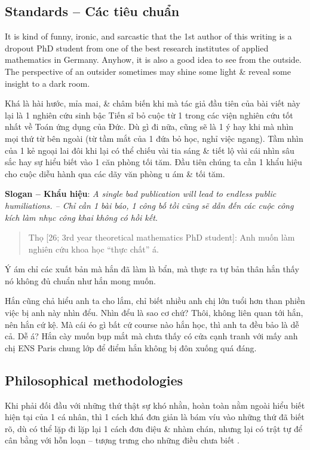 \documentclass[12pt]{article}
\begin{document}
\subsection{Standards -- Các tiêu chuẩn}
It is kind of funny, ironic, and sarcastic that the 1st author of this writing is a dropout PhD student from one of the best research institutes of applied mathematics in Germany. Anyhow, it is also a good idea to see from the outside. The perspective of an outsider sometimes may shine some light \& reveal some insight to a dark room.

Khá là hài hước, mỉa mai, \& châm biến khi mà tác giả đầu tiên của bài viết này lại là 1 nghiên cứu sinh bậc Tiến sĩ bỏ cuộc từ 1 trong các viện nghiên cứu tốt nhất về Toán ứng dụng của Đức. Dù gì đi nữa, cũng sẽ là 1 ý hay khi mà nhìn mọi thứ từ bên ngoài (từ tầm mắt của 1 đứa bỏ học, nghỉ việc ngang). Tầm nhìn của 1 kẻ ngoại lai đôi khi lại có thể chiếu vài tia sáng \& tiết lộ vài cái nhìn sâu sắc hay sự hiểu biết vào 1 căn phòng tối tăm. Đầu tiên chúng ta cần 1 khẩu hiệu cho cuộc diễu hành qua các dãy văn phòng u ám \& tối tăm.

\vspace{2mm}
\noindent\textsf{\textbf{Slogan -- Khẩu hiệu}}: {\it A single bad publication will lead to endless public humiliations. -- Chỉ cần 1 bài báo, 1 công bố tồi cũng sẽ dẫn đến các cuộc công kích làm nhục công khai không có hồi kết}.

\begin{quote}
	{\sf Thọ [26; 3rd year theoretical mathematics PhD student]}: Anh muốn làm nghiên cứu khoa học ``thực chất'' á.
\end{quote}
Ý ám chỉ các xuất bản mà hắn đã làm là bẩn, mà thực ra tự bản thân hắn thấy nó không đủ chuẩn như hắn mong muốn.

Hắn cũng chả hiểu anh ta cho lắm, chỉ biết nhiều anh chị lớn tuổi hơn than phiền việc bị anh này nhìn đểu. Nhìn đểu là sao cơ chứ? Thôi, không liên quan tới hắn, nên hắn cứ kệ. Mà cái éo gì bất cứ course nào hắn học, thì anh ta đều bảo là dễ cả. Dễ á? Hắn cày muốn bụp mắt mà chưa thấy có cửa cạnh tranh với mấy anh chị ENS Paris chung lớp để điểm hắn không bị đôn xuống quá đáng.


\subsection{Philosophical methodologies}
Khi phải đối đầu với những thứ thật sự khó nhằn, hoàn toàn nằm ngoài hiểu biết hiện tại của 1 cá nhân, thì 1 cách khá đơn giản là bám víu vào những thứ đã biết rõ, dù có thể lặp đi lặp lại 1 cách đơn điệu \& nhàm chán, nhưng lại có trật tự để cân bằng với hỗn loạn -- tượng trưng cho những điều chưa biết \cite{Peterson2018,Peterson2022a,Peterson2022b}.
\end{document}
